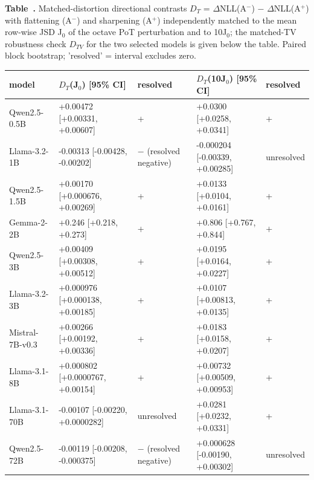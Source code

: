 \begingroup
{}%
\par\medskip\noindent{}\label{tab:appx-dt}{\small\textbf{Table~\thetable.} Matched-distortion directional contrasts $D_T$ = $\Delta$NLL(A$^-$) $-$ $\Delta$NLL(A$^+$) with flattening (A$^-$) and sharpening (A$^+$) independently matched to the mean row-wise JSD J$_0$ of the octave PoT perturbation and to 10J$_0$; the matched-TV robustness check $D_{TV}$ for the two selected models is given below the table. Paired block bootstrap; 'resolved' = interval excludes zero.}\par\smallskip
{}
{\scriptsize
\renewcommand{\theHtable}{\thetable.lt\arabic{LT@tables}}%
\setlength{\tabcolsep}{4pt}
\begin{longtable}{@{}lllll@{}}
\toprule
\textbf{model} & \textbf{$D_T$(J$_0$) [95\% CI]} & \textbf{resolved} & \textbf{$D_T$(10J$_0$) [95\% CI]} & \textbf{resolved} \\
\midrule
\endhead
Qwen2.5-0.5B & +0.00472 [+0.00331, +0.00607] & + & +0.0300 [+0.0258, +0.0341] & + \\
Llama-3.2-1B & -0.00313 [-0.00428, -0.00202] & $-$ (resolved negative) & -0.000204 [-0.00339, +0.00285] & unresolved \\
Qwen2.5-1.5B & +0.00170 [+0.000676, +0.00269] & + & +0.0133 [+0.0104, +0.0161] & + \\
Gemma-2-2B & +0.246 [+0.218, +0.273] & + & +0.806 [+0.767, +0.844] & + \\
Qwen2.5-3B & +0.00409 [+0.00308, +0.00512] & + & +0.0195 [+0.0164, +0.0227] & + \\
Llama-3.2-3B & +0.000976 [+0.000138, +0.00185] & + & +0.0107 [+0.00813, +0.0135] & + \\
Mistral-7B-v0.3 & +0.00266 [+0.00192, +0.00336] & + & +0.0183 [+0.0158, +0.0207] & + \\
Llama-3.1-8B & +0.000802 [+0.0000767, +0.00154] & + & +0.00732 [+0.00509, +0.00953] & + \\
Llama-3.1-70B & -0.00107 [-0.00220, +0.0000282] & unresolved & +0.0281 [+0.0232, +0.0331] & + \\
Qwen2.5-72B & -0.00119 [-0.00208, -0.000375] & $-$ (resolved negative) & +0.000628 [-0.00190, +0.00302] & unresolved \\
\bottomrule
\end{longtable}
\addtocounter{table}{-1}
}
